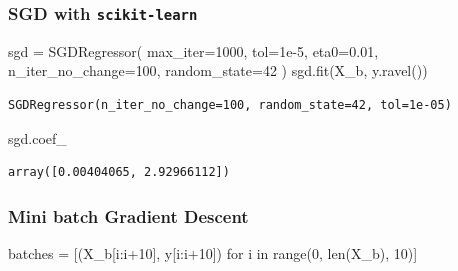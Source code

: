 \documentclass[
]{report}
\newenvironment{Shaded}{\begin{snugshade}}{\end{snugshade}}
\newcommand{\BuiltInTok}[1]{\textcolor[rgb]{0.00,0.23,0.31}{#1}}
\newcommand{\ControlFlowTok}[1]{\textcolor[rgb]{0.00,0.23,0.31}{#1}}
\newcommand{\DecValTok}[1]{\textcolor[rgb]{0.68,0.00,0.00}{#1}}
\newcommand{\FloatTok}[1]{\textcolor[rgb]{0.68,0.00,0.00}{#1}}
\newcommand{\KeywordTok}[1]{\textcolor[rgb]{0.00,0.23,0.31}{#1}}
\newcommand{\NormalTok}[1]{\textcolor[rgb]{0.00,0.23,0.31}{#1}}
\newcommand{\OperatorTok}[1]{\textcolor[rgb]{0.37,0.37,0.37}{#1}}
\begin{document}
\hypertarget{sgd-with-scikit-learn}{%
\subsubsection{\texorpdfstring{SGD with
\texttt{scikit-learn}}{SGD with scikit-learn}}\label{sgd-with-scikit-learn}}

\begin{Shaded}
\begin{Highlighting}[]
\NormalTok{sgd }\OperatorTok{=}\NormalTok{ SGDRegressor(}
\NormalTok{    max\_iter}\OperatorTok{=}\DecValTok{1000}\NormalTok{, }
\NormalTok{    tol}\OperatorTok{=}\FloatTok{1e{-}5}\NormalTok{, }
\NormalTok{    eta0}\OperatorTok{=}\FloatTok{0.01}\NormalTok{, }
\NormalTok{    n\_iter\_no\_change}\OperatorTok{=}\DecValTok{100}\NormalTok{, }
\NormalTok{    random\_state}\OperatorTok{=}\DecValTok{42}
\NormalTok{)}
\NormalTok{sgd.fit(X\_b, y.ravel())}
\end{Highlighting}
\end{Shaded}

\begin{verbatim}
SGDRegressor(n_iter_no_change=100, random_state=42, tol=1e-05)
\end{verbatim}

\begin{Shaded}
\begin{Highlighting}[]
\NormalTok{sgd.coef\_}
\end{Highlighting}
\end{Shaded}

\begin{verbatim}
array([0.00404065, 2.92966112])
\end{verbatim}

\hypertarget{mini-batch-gradient-descent}{%
\subsubsection{Mini batch Gradient
Descent}\label{mini-batch-gradient-descent}}

\begin{Shaded}
\begin{Highlighting}[]
\NormalTok{batches }\OperatorTok{=}\NormalTok{ [(X\_b[i:i}\OperatorTok{+}\DecValTok{10}\NormalTok{], y[i:i}\OperatorTok{+}\DecValTok{10}\NormalTok{]) }\ControlFlowTok{for}\NormalTok{ i }\KeywordTok{in} \BuiltInTok{range}\NormalTok{(}\DecValTok{0}\NormalTok{, }\BuiltInTok{len}\NormalTok{(X\_b), }\DecValTok{10}\NormalTok{)]}
\end{Highlighting}
\end{Shaded}
\end{document}
